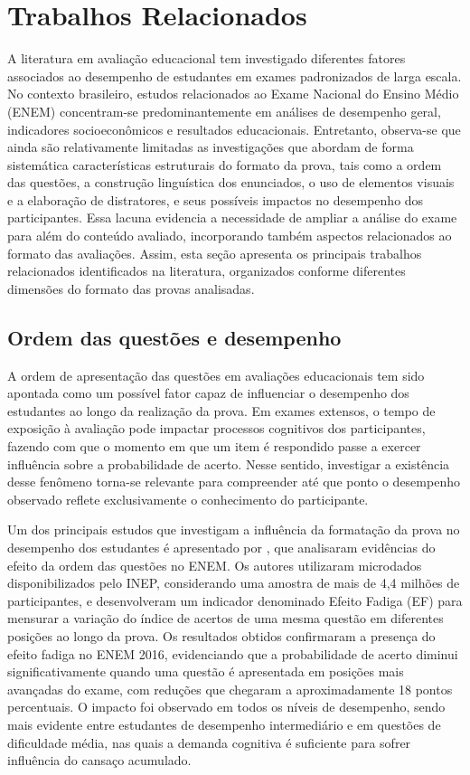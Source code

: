 \documentclass[a4paper,10pt, twocolumn]{article}
\begin{document}
\section{Trabalhos Relacionados}

A literatura em avaliação educacional tem investigado diferentes fatores associados ao desempenho de estudantes em exames padronizados de larga escala. No contexto brasileiro, estudos relacionados ao Exame Nacional do Ensino Médio (ENEM) concentram-se predominantemente em análises de desempenho geral, indicadores socioeconômicos e resultados educacionais. Entretanto, observa-se que ainda são relativamente limitadas as investigações que abordam de forma sistemática características estruturais do formato da prova, tais como a ordem das questões, a construção linguística dos enunciados, o uso de elementos visuais e a elaboração de distratores, e seus possíveis impactos no desempenho dos participantes. Essa lacuna evidencia a necessidade de ampliar a análise do exame para além do conteúdo avaliado, incorporando também aspectos relacionados ao formato das avaliações. Assim, esta seção apresenta os principais trabalhos relacionados identificados na literatura, organizados conforme diferentes dimensões do formato das provas analisadas.

\subsection{Ordem das questões e desempenho}

A ordem de apresentação das questões em avaliações educacionais tem sido apontada como um possível fator capaz de influenciar o desempenho dos estudantes ao longo da realização da prova. Em exames extensos, o tempo de exposição à avaliação pode impactar processos cognitivos dos participantes, fazendo com que o momento em que um item é respondido passe a exercer influência sobre a probabilidade de acerto. Nesse sentido, investigar a existência desse fenômeno torna-se relevante para compreender até que ponto o desempenho observado reflete exclusivamente o conhecimento do participante.

Um dos principais estudos que investigam a influência da formatação da prova no desempenho dos estudantes é apresentado por \textcite{Barichello2022}, que analisaram evidências do efeito da ordem das questões no ENEM. Os autores utilizaram microdados disponibilizados pelo INEP, considerando uma amostra de mais de 4,4 milhões de participantes, e desenvolveram um indicador denominado Efeito Fadiga (EF) para mensurar a variação do índice de acertos de uma mesma questão em diferentes posições ao longo da prova. Os resultados obtidos confirmaram a presença do efeito fadiga no ENEM 2016, evidenciando que a probabilidade de acerto diminui significativamente quando uma questão é apresentada em posições mais avançadas do exame, com reduções que chegaram a aproximadamente 18 pontos percentuais. O impacto foi observado em todos os níveis de desempenho, sendo mais evidente entre estudantes de desempenho intermediário e em questões de dificuldade média, nas quais a demanda cognitiva é suficiente para sofrer influência do cansaço acumulado. 
\end{document}
